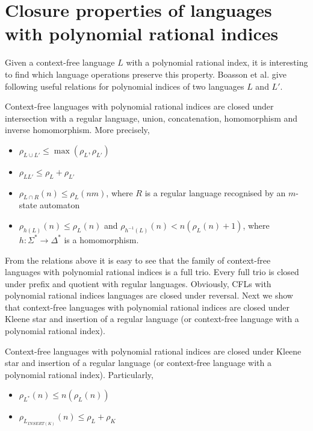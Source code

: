 \section{Closure properties of languages with polynomial rational indices}
\label{sec:closure}
Given a context-free language $L$ with a polynomial rational index, it is interesting to find which language operations preserve this property.  Boasson et al. \cite{RatBasic} give following useful relations for polynomial indices of two languages $L$ and $L'$.
\begin{theorem}
Context-free languages with polynomial rational indices are closed under intersection with a regular language, union, concatenation, homomorphism and inverse homomorphism. More precisely,
\begin{itemize}
\item $\rho_{L \cup L'} \le  \max{(\rho_L, \rho_{L'})} $
\item $\rho_{LL'} \le \rho_L + \rho_{L'}$
\item $\rho_{L \cap R}(n) \le \rho_L(nm)$, where $R$ is a regular language recognised by an $m$-state automaton
\item $\rho_{h(L)}(n) \le \rho_L(n)$ and $\rho_{h^{-1}(L)}(n) < n(\rho_L(n) +1)$, where $h: \Sigma^* \rightarrow \Delta^*$ is a homomorphism.
\end{itemize}
\end{theorem}
From the relations above it is easy to see that the family of context-free languages with polynomial rational indices is a full trio. Every full trio is closed under prefix and quotient with regular languages. Obviously, CFLs with polynomial rational indices languages are closed under reversal.  Next we show that context-free languages with polynomial rational indices are closed under Kleene star and insertion of a regular language (or context-free language with a polynomial rational index).
\begin{theorem}
Context-free languages with polynomial rational indices are closed under Kleene star and insertion of a regular language  (or context-free language with a polynomial rational index). Particularly,
\begin{itemize}
\item $\rho_{L^{*}}(n) \le n(\rho_L(n))$
\item $\rho_{L_{INSERT(K)}}(n) \le \rho_L + \rho_{K}$
\end{itemize}
\end{theorem}
